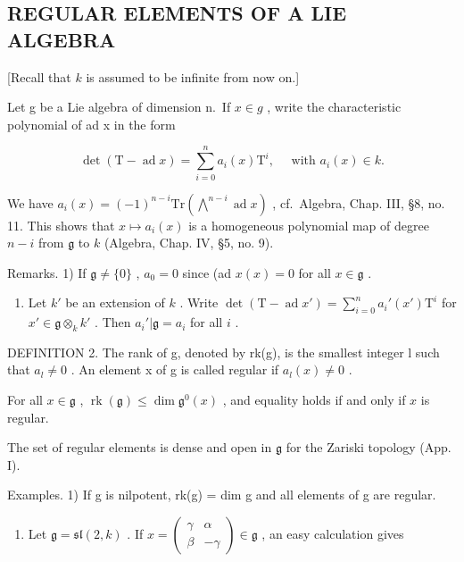 \subsection{REGULAR ELEMENTS OF A LIE ALGEBRA}

{[}Recall that \(k\) is assumed to be infinite from now on.{]}

Let g be a Lie algebra of dimension n.~If \(x \in g\) , write the characteristic polynomial of ad x in the form

\[
\det (\mathrm{T} - \operatorname{ad} x) = \sum_ {i = 0} ^ {n} a _ {i} (x) \mathrm{T} ^ {i}, \quad \text { with } a _ {i} (x) \in k.
\]

We have \(a_i(x) = (-1)^{n - i}\mathrm{Tr}\left(\bigwedge^{n - i}\operatorname {ad}x\right)\) , cf.~Algebra, Chap. III, §8, no. 11. This shows that \(x\mapsto a_i(x)\) is a homogeneous polynomial map of degree \(n - i\) from \(\mathfrak{g}\) to \(k\) (Algebra, Chap. IV, §5, no. 9).

Remarks. 1) If \(\mathfrak{g} \neq \{0\}\) , \(a_0 = 0\) since (ad \(x(x) = 0\) for all \(x \in \mathfrak{g}\) .

\begin{enumerate}
\def\labelenumi{\arabic{enumi})}
\setcounter{enumi}{1}
\tightlist
\item
  Let \(k'\) be an extension of \(k\) . Write \(\det(\mathrm{T} - \operatorname{ad} x') = \sum_{i=0}^{n} a_i'(x') \mathrm{T}^i\) for \(x' \in \mathfrak{g} \otimes_k k'\) . Then \(a_i'| \mathfrak{g} = a_i\) for all \(i\) .
\end{enumerate}

DEFINITION 2. The rank of g, denoted by rk(g), is the smallest integer l such that \(a_{l} \neq 0\) . An element x of g is called regular if \(a_{l}(x) \neq 0\) .

For all \(x \in \mathfrak{g}\) , \(\operatorname{rk}(\mathfrak{g}) \leq \dim \mathfrak{g}^0(x)\) , and equality holds if and only if \(x\) is regular.

The set of regular elements is dense and open in \(\mathfrak{g}\) for the Zariski topology (App. I).

Examples. 1) If g is nilpotent, rk(g) = dim g and all elements of g are regular.

\begin{enumerate}
\def\labelenumi{\arabic{enumi})}
\setcounter{enumi}{1}
\tightlist
\item
  Let \(\mathfrak{g} = \mathfrak{sl}(2,k)\) . If \(x = \begin{pmatrix} \gamma & \alpha \\ \beta & -\gamma \end{pmatrix} \in \mathfrak{g}\) , an easy calculation gives
\end{enumerate}


